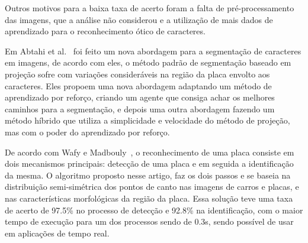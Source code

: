 Outros motivos para a baixa taxa de acerto foram a falta de pré-processamento
das imagens, que a análise não considerou e a utilização de mais dados de
aprendizado para o reconhecimento ótico de caracteres.

Em Abtahi et al.~\cite{abtahi2015deep} foi feito um nova abordagem para a segmentação de
caracteres em imagens, de acordo com eles, o método padrão de segmentação
baseado em projeção sofre com variações consideráveis na região da placa envolto
aos caracteres. Eles propoem uma nova abordagem adaptando um método de
aprendizado por reforço, criando um agente que consiga achar os melhores
caminhos para a segmentação, e depois uma outra abordagem fazendo um método
híbrido que utiliza a simplicidade e velocidade do método de projeção, mas com o
poder do aprendizado por reforço.

De acordo com Wafy e Madbouly~\cite{wafy2016efficient}, o reconhecimento de uma placa consiste
em dois mecanismos principais: detecção de uma placa e em seguida a
identificação da mesma. O algoritmo proposto nesse artigo, faz os dois passos e
se baseia na distribuição semi-simétrica dos pontos de canto nas imagens de
carros e placas, e nas características morfológicas da região da placa. Essa
solução teve uma taxa de acerto de 97.5\% no processo de detecção e 92.8\% na
identificação, com o maior tempo de execução para um dos processos sendo de
0.3s, sendo possível de usar em aplicações de tempo real.
